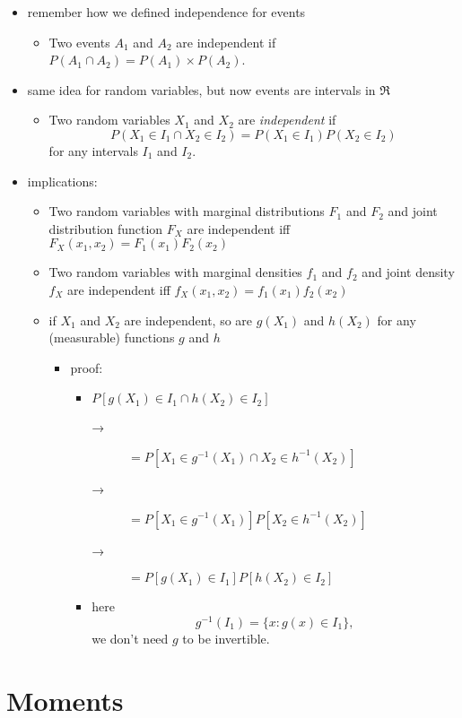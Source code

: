 \documentclass[11pt]{article}
\begin{document}
\begin{itemize}
\item remember how we defined independence for events
\begin{itemize}
\item Two events $A_1$ and $A_2$ are independent if $P(A_1 \cap
         A_2) = P(A_1) \times P(A_2)$.
\end{itemize}
\item same idea for random variables, but now events are intervals in $\Re$
\begin{itemize}
\item Two random variables $X_1$ and $X_2$ are \emph{independent} if \[
         P(X_1 \in I_1 \cap X_2 \in I_2) = P(X_1 \in I_1) P(X_2 \in
         I_2)\] for any intervals $I_1$ and $I_2$.
\end{itemize}
\item implications:
\begin{itemize}
\item Two random variables with marginal distributions $F_1$ and
         $F_2$ and joint distribution function $F_X$ are independent iff
         $F_X(x_1, x_2) = F_1(x_1) F_2(x_2)$
\item Two random variables with marginal densities $f_1$ and $f_2$
         and joint density $f_X$ are independent iff 
         $f_X(x_1,x_2) = f_1(x_1) f_2(x_2)$
\item if $X_1$ and $X_2$ are independent, so are $g(X_1)$ and
         $h(X_2)$ for any (measurable) functions $g$ and $h$
\begin{itemize}
\item proof:
\begin{itemize}
\item $P[g(X_1) \in I_1 \cap h(X_2) \in I_2]$
\begin{description}
\item[→] $= P[X_1 \in g^{-1}(X_1) \cap X_2 \in h^{-1}(X_2)]$
\item[→] $= P[X_1 \in g^{-1}(X_1)] P[X_2 \in h^{-1}(X_2)]$
\item[→] $= P[g(X_1) \in I_1] P[h(X_2) \in I_2]$
\end{description}
\item here \[g^{-1}(I_1) = \{x : g(x) \in I_1\},\] we don't
             need $g$ to be invertible.
\end{itemize}
\end{itemize}
\end{itemize}
\end{itemize}
\section{Moments}
\label{sec-3}
\end{document}
